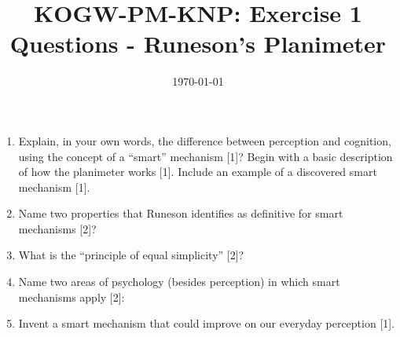 \documentclass[12pt,english]{scrartcl}
\title{KOGW-PM-KNP:  Exercise 1 Questions - Runeson’s Planimeter}
\author{}
\date{\today}
\begin{document}
\maketitle

\begin{enumerate}
 \item Explain, in your own words, the difference between perception and cognition, using the concept of a “smart” mechanism [1]? Begin with a basic description of how the planimeter works [1]. Include an example of a discovered smart mechanism [1].
 \item Name two properties that Runeson identifies as definitive for smart mechanisms [2]?
 \item What is the “principle of equal simplicity” [2]?
 \item Name two areas of psychology (besides perception) in which smart mechanisms apply [2]:
 \item Invent a smart mechanism that could improve on our everyday perception [1].
\end{enumerate}
\end{document}
